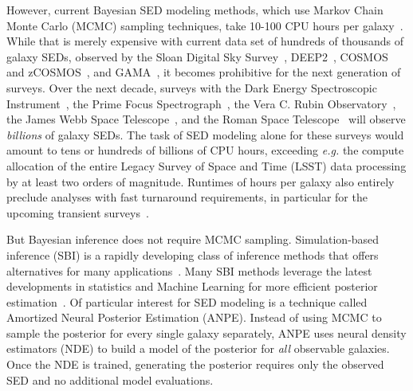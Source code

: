 However, current Bayesian SED modeling methods, which use Markov Chain Monte
Carlo (MCMC) sampling techniques, take 10-100 CPU hours per
galaxy~\citep[\emph{e.g.}][]{carnall2019a, tacchella2021}. 
While that is merely expensive with current data set of hundreds of thousands of 
galaxy SEDs, observed by the Sloan Digital Sky Survey~\citep[SDSS;][]{york2000},
DEEP2~\citep{davis2003}, COSMOS and zCOSMOS~\citep{scoville2007, lilly2007},
and GAMA~\citep{baldry2018}, it becomes prohibitive for the next generation of surveys.
Over the next decade, surveys with the 
Dark Energy Spectroscopic Instrument~\citep[DESI;][]{desicollaboration2016},
the Prime Focus Spectrograph~\citep[PFS;][]{takada2014}, 
the Vera C. Rubin Observatory~\citep{ivezic2019}, 
the James Webb Space Telescope~\citep{gardner2006},
and the Roman Space Telescope~\citep{spergel2015} will observe \emph{billions}
of galaxy SEDs.
The task of SED modeling alone for these surveys would amount to tens or
hundreds of billions of CPU hours, exceeding \emph{e.g.} the compute allocation
of the entire Legacy Survey of Space and Time (LSST) data processing by at
least two orders of magnitude.
Runtimes of hours per galaxy also entirely preclude analyses with fast
turnaround requirements, in particular for the upcoming transient
surveys~\citep{lsstscience}.

But Bayesian inference does not require MCMC sampling.  
Simulation-based inference (SBI) is a rapidly developing class of inference
methods that offers alternatives for many applications~\citep[see][and
references therein]{cranmer2020}.
Many SBI methods leverage the latest developments in statistics and Machine
Learning for more efficient posterior estimation~\citep{papamakarios2017,
alsing2019a, hahn2019c, dax2021, huppenkothen2021, zhang2021}. 
Of particular interest for SED modeling is a technique called Amortized
Neural Posterior Estimation (ANPE). 
Instead of using MCMC to sample the posterior for every single galaxy
separately, ANPE uses neural density estimators (NDE) to build a model of the
posterior for \emph{all} observable galaxies.
Once the NDE is trained, generating the posterior requires only the observed
SED and no additional model evaluations.

